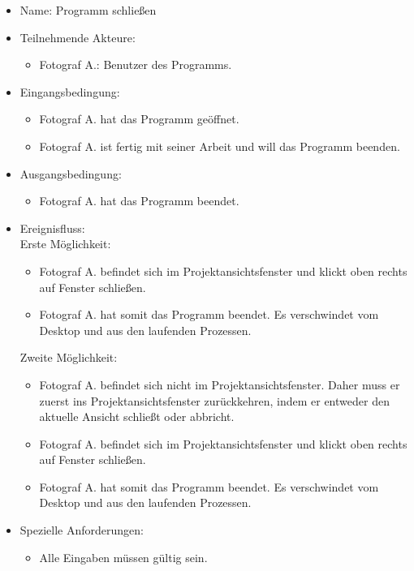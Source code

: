 	\begin{itemize}
		\item Name: Programm schließen
		\item Teilnehmende Akteure:
		\begin{itemize}
			\item	Fotograf A.: Benutzer des Programms.
		\end{itemize}
		\item Eingangsbedingung:
		\begin{itemize}
			\item Fotograf A. hat das Programm geöffnet.
			\item Fotograf A. ist fertig mit seiner Arbeit und will das Programm beenden.						
		\end{itemize}
		\item Ausgangsbedingung:
		\begin{itemize}
			\item	Fotograf A. hat das Programm beendet.		
		\end{itemize}
		\item Ereignisfluss:\\Erste Möglichkeit:	
		\begin{itemize}
			\item Fotograf A. befindet sich im Projektansichtsfenster und klickt oben rechts auf Fenster schließen.
			\item Fotograf A. hat somit das Programm beendet. Es verschwindet vom Desktop und aus den laufenden Prozessen.
		\end{itemize}
		Zweite Möglichkeit:
		\begin{itemize}
			\item Fotograf A. befindet sich nicht im Projektansichtsfenster. Daher muss er zuerst ins Projektansichtsfenster zurückkehren, indem er entweder den aktuelle Ansicht schließt oder abbricht.
			\item Fotograf A. befindet sich im Projektansichtsfenster und klickt oben rechts auf Fenster schließen.
			\item Fotograf A. hat somit das Programm beendet. Es verschwindet vom Desktop und aus den laufenden Prozessen.
		\end{itemize}	
		\item Spezielle Anforderungen:
		\begin{itemize}
			\item	Alle Eingaben müssen gültig sein.		
		\end{itemize}
	\end{itemize}
	
